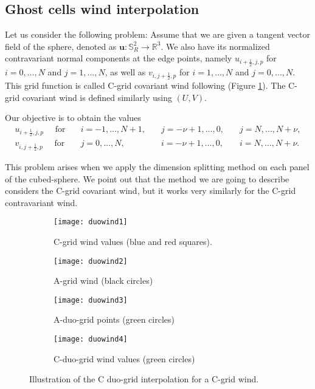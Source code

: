 \subsection{Ghost cells wind interpolation}
\label{cs-wind-interp}
Let us consider the following problem: Assume that we are given a tangent vector field of the sphere, denoted as 
$\boldsymbol{u}:\mathbb{S}^2_R \to \mathbb{R}^3$. We also have its normalized contravariant normal components at the edge points, 
namely $u_{i+\frac{1}{2},j,p}$ for $i=0, \ldots, N$ and $j=1, \ldots, N$, as well as
$v_{i,j+\frac{1}{2},p}$ for $i=1, \ldots, N$ and $j=0, \ldots, N$. This grid function is called C-grid covariant wind following \citet{arakawa:1977} (Figure \ref{cs-duovec-1}). The C-grid covariant wind is defined similarly using $(U,V)$.

Our objective is to obtain the values 
\begin{align*}
	u_{i+\frac{1}{2},j,p} \quad \text{ for} \quad &i=-1, \ldots, N+1, \quad &j=-\nu+1, \ldots, 0, \quad &j=N, \ldots, N+\nu,\\
	v_{i,j+\frac{1}{2},p} \quad \text{ for} \quad &j=0, \ldots, N, \quad &i=-\nu+1, \ldots, 0,\quad &i=N, \ldots, N+\nu.
\end{align*}


This problem arises when we apply the dimension splitting method on each panel of the cubed-sphere.
We point out that the method we are going to describe considers the C-grid covariant wind, but it works very similarly for the C-grid contravariant wind.
\begin{figure}[!htb]
	\centering
	\begin{subfigure}{0.45\textwidth}
		\centering
		\texttt{[image: duowind1]}
		\caption{C-grid wind values (blue and red squares).\label{cs-duovec-1}}
	\end{subfigure}
	\begin{subfigure}{0.45\textwidth}
		\centering
		\texttt{[image: duowind2]}
		\caption{A-grid wind (black circles)\label{cs-duovec-2}}
	\end{subfigure}
	
	\begin{subfigure}{0.45\textwidth}
		\centering
		\texttt{[image: duowind3]}
		\caption{A-duo-grid points (green circles)\label{cs-duovec-3}}
	\end{subfigure}
	\begin{subfigure}{0.45\textwidth}
		\centering
		\texttt{[image: duowind4]}
		\caption{C-duo-grid  wind values (green circles) \label{cs-duovec-4}}
	\end{subfigure}
	\caption{Illustration of the C duo-grid interpolation for a C-grid wind. \label{cs-duovec}}
\end{figure}

